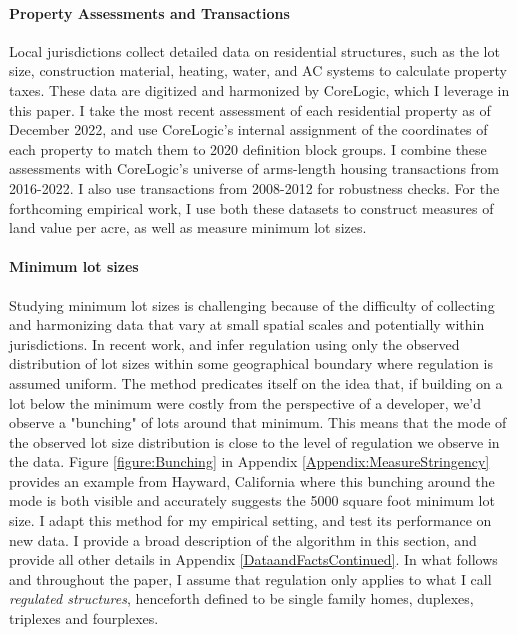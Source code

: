 \documentclass[12pt]{article}
\begin{document}
	 \paragraph*{Property Assessments and Transactions} Local jurisdictions collect detailed data on residential structures, such as the lot size, construction material, heating, water, and AC systems to calculate property taxes. These data are digitized and harmonized by CoreLogic, which I leverage in this paper. I take the most recent assessment of each residential property as of December 2022, and use CoreLogic's internal assignment of the coordinates of each property to match them to 2020 definition block groups. I combine these assessments with CoreLogic's universe of arms-length housing transactions from 2016-2022. I also use transactions from 2008-2012 for robustness checks. For the forthcoming empirical work, I use both these datasets to construct measures of land value per acre, as well as measure minimum lot sizes.
	  
	 \paragraph*{Minimum lot sizes}
	 Studying minimum lot sizes is challenging because of the difficulty of collecting and harmonizing data that vary at small spatial scales and potentially within jurisdictions. In recent work, \cite{Song} and \cite{Cui} infer regulation using only the observed distribution of lot sizes within some geographical boundary where regulation is assumed uniform. The method predicates itself on the idea that, if building on a lot below the minimum were costly from the perspective of a developer, we'd observe a "bunching" of lots around that minimum. This means that the mode of the observed lot size distribution is close to the level of regulation we observe in the data. Figure \ref{figure:Bunching} in Appendix \ref{Appendix:MeasureStringency} provides an example from Hayward, California where this bunching around the mode is both visible and accurately suggests the 5000 square foot minimum lot size. I adapt this method for my empirical setting, and test its performance on new data. I provide a broad description of the algorithm in this section, and provide all other details in Appendix \ref{DataandFactsContinued}. In what follows and throughout the paper, I assume that regulation only applies to what I call \textit{regulated structures}, henceforth defined to be single family homes, duplexes, triplexes and fourplexes. 
	 
\end{document}

